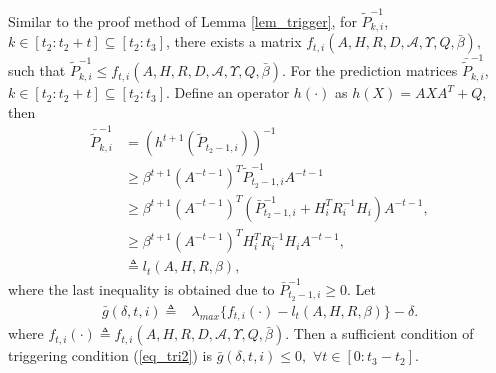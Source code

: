 \documentclass[journal,transmag]{IEEEtran}
\begin{document}
{		Similar to the proof method of Lemma \ref{lem_trigger}, for $\tilde P_{k,i}^{-1}$, $k\in [t_2:t_2+t]\subseteq [t_2:t_3]$, there exists a matrix $f_{t,i} (A,H,R,D,\mathcal{A},\Upsilon,Q,\bar\beta),$ such that $\tilde P_{k,i}^{-1}\leq 	f_{t,i} (A,H,R,D,\mathcal{A},\Upsilon,Q,\bar\beta).$ 
		For the prediction matrices $\bar{\tilde{P}}_{k,i}^{-1}$, $  k\in [t_2:t_2+t]\subseteq [t_2:t_3]$. Define an operator $h(\cdot)$ as $h(X)=AXA^T+Q$, then
		\begin{align*}
		\bar{\tilde{P}}_{k,i}^{-1}&=\left(h^{t+1}(\tilde{P}_{t_2-1,i})\right)^{-1}\\
		&\geq \beta^{t+1} (A^{-t-1})^T\tilde{P}_{t_2-1,i}^{-1}A^{-t-1}\\
		&\geq \beta^{t+1} (A^{-t-1})^T(\bar P_{t_2-1,i}^{-1}+H_{i}^TR_{i}^{-1}H_{i})A^{-t-1},\\
		&\geq \beta^{t+1} (A^{-t-1})^TH_{i}^TR_{i}^{-1}H_{i}A^{-t-1},\\
		&\triangleq l_{t}(A,H,R,\beta),
		\end{align*}
		where the last inequality is obtained due to $\bar P_{t_2-1,i}^{-1}\geq 0.$
		Let
		\begin{align}\label{eq_ferror2}
		\bar g(\delta,t,i)\triangleq &\lambda_{max}\{f_{t,i}(\cdot)-l_{t}(A,H,R,\beta)\}-\delta.
		\end{align}
		where $f_{t,i}(\cdot)\triangleq f_{t,i} (A,H,R,D,\mathcal{A},\Upsilon,Q,\bar\beta)$.
		Then a sufficient condition of triggering condition (\ref{eq_tri2}) is 
		$\bar g(\delta,t,i)\leq 0,$ $\forall t\in  [0:t_3-t_2]$.
		
		

	
	
}
\end{document}
